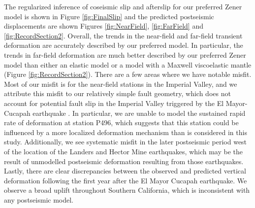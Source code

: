 \documentclass[1p]{elsarticle}
\begin{document}
The regularized inference of coseismic slip and afterslip for our preferred Zener model is shown in Figure \ref{fig:FinalSlip} and the predicted postseismic displacements are shown Figures \ref{fig:NearField}, \ref{fig:FarField} and \ref{fig:RecordSection2}.  Overall, the trends in the near-field and far-field transient deformation are accurately described by our preferred model.  In particular, the trends in far-field deformation are much better described by our preferred Zener model than either an elastic model or a model with a Maxwell viscoelastic mantle (Figure \ref{fig:RecordSection2}).  There are a few areas where we have notable misfit.  Most of our misfit is for the near-field stations in the Imperial Valley, and we attribute this misfit to our relatively simple fault geometry, which does not account for potential fault slip in the Imperial Valley triggered by the El Mayor-Cucapah earthquake \citep{Wei2011a,Wei2015}. In particular, we are unable to model the sustained rapid rate of deformation at station P496, which suggests that this station could be influenced by a more localized deformation mechanism than is considered in this study.
Additionally, we see systematic misfit in the later postseismic period west of the location of the Landers and Hector Mine earthquakes, which may be the result of unmodelled postseismic deformation resulting from those earthquakes.  Lastly, there are clear discrepancies between the observed and predicted vertical deformation following the first year after the El Mayor Cucapah earthquake. We observe a broad uplift throughout Southern California, which is inconsistent with any postseismic model.
\end{document}
